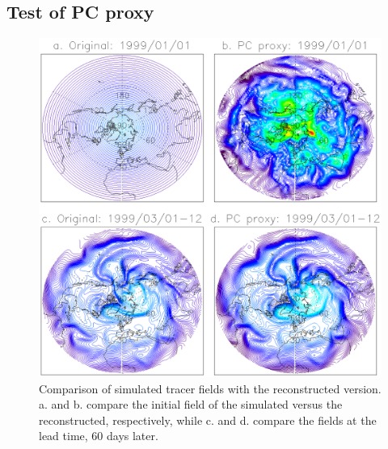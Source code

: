 \documentclass{article}
\begin{document}
\subsection{Test of PC proxy}

\begin{figure}
\begin{center}
\includegraphics[width=1\textwidth]{../pc_proxy/proxyfields.eps}
\caption{Comparison of simulated tracer fields with the reconstructed version.
a. and b. compare the initial field of the simulated versus the reconstructed,
respectively, while c. and d. compare the fields at the lead time,
60 days later.}
\label{proxyfields}
\end{center}
\end{figure}
\end{document}
